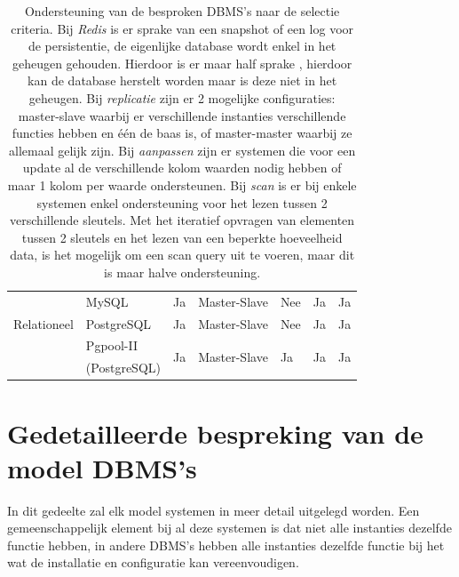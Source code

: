 \begin{table}[htbp]
{\begin{tabular}{ll|lllll}
          \hline
    \multirow{3}[0]{*}{Relationeel} & MySQL & Ja    & Master-Slave & Nee   & Ja    & Ja \\
    	  & PostgreSQL & Ja    & Master-Slave & Nee   & Ja    & Ja \\
          & Pgpool-II & \multicolumn{1}{l}{\multirow{2}[0]{*}{Ja}} & \multicolumn{1}{l}{\multirow{2}[0]{*}{Master-Slave}} & \multicolumn{1}{l}{\multirow{2}[0]{*}{Ja}} & \multicolumn{1}{l}{\multirow{2}[0]{*}{Ja}} & \multicolumn{1}{l}{\multirow{2}[0]{*}{Ja}} \\
          & (PostgreSQL) & \multicolumn{1}{l}{} & \multicolumn{1}{l}{} & \multicolumn{1}{l}{} & \multicolumn{1}{l}{} & \multicolumn{1}{l}{} \\
    \end{tabular}%
    }
    \caption{Ondersteuning van de besproken DBMS's naar de selectie criteria. \newline
    Bij \textit{Redis} is er sprake van een snapshot of een log voor de persistentie, de eigenlijke database wordt enkel in het geheugen gehouden. Hierdoor is er maar half sprake , hierdoor kan de database herstelt worden maar is deze niet in het geheugen.\newline 
    Bij \textit{replicatie} zijn er 2 mogelijke configuraties: master-slave waarbij er verschillende instanties verschillende functies hebben en één de baas is, of master-master waarbij ze allemaal gelijk zijn. \newline 
    Bij \textit{aanpassen} zijn er systemen die voor een update al de verschillende kolom waarden nodig hebben of maar 1 kolom per waarde ondersteunen.\newline 
    Bij \textit{scan} is er bij enkele systemen enkel ondersteuning voor het lezen tussen 2 verschillende sleutels. Met het iteratief opvragen van elementen tussen 2 sleutels en het lezen van een beperkte hoeveelheid data, is het mogelijk om een scan query uit te voeren, maar dit is maar halve ondersteuning. }
  \label{table:vergelijkingNosql}%
\end{table}%

\section{Gedetailleerde bespreking van de model DBMS's}
In dit gedeelte zal elk model systemen in meer detail uitgelegd worden. Een gemeenschappelijk element bij al deze systemen is dat niet alle instanties dezelfde functie hebben, in andere DBMS's hebben alle instanties dezelfde functie bij het wat de installatie en configuratie kan vereenvoudigen. 

